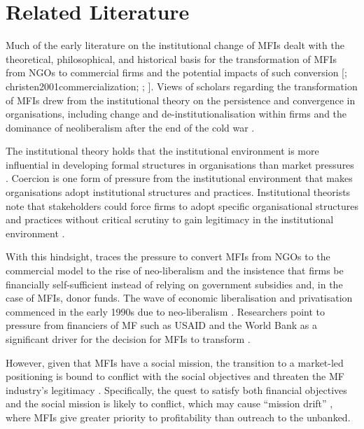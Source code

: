 \documentclass[a4paper, nobind]{templates/ociamthesis}
\begin{document}
\hypertarget{related-literature}{%
\section{Related Literature}\label{related-literature}}

Much of the early literature on the institutional change of MFIs dealt with the theoretical, philosophical, and historical basis for the transformation of MFIs from NGOs to commercial firms and the potential impacts of such conversion {[}\textcite{campion1999institutional}; christen2001commercialization; \textcite{gutierrez201920}; \textcite{zaby2019science}{]}. Views of scholars regarding the transformation of MFIs drew from the institutional theory on the persistence and convergence in organisations, including change and de-institutionalisation within firms \autocite{scott2004institutional} and the dominance of neoliberalism after the end of the cold war \autocite{ostry2017}.

The institutional theory holds that the institutional environment is more influential in developing formal structures in organisations than market pressures \autocite{maggio1991}. Coercion is one form of pressure from the institutional environment that makes organisations adopt institutional structures and practices. Institutional theorists note that stakeholders could force firms to adopt specific organisational structures and practices without critical scrutiny to gain legitimacy in the institutional environment \autocite{scott2004institutional,martinez2017coercive}.

With this hindsight, \textcite{bateman2010doesn} traces the pressure to convert MFIs from NGOs to the commercial model to the rise of neo-liberalism and the insistence that firms be financially self-sufficient instead of relying on government subsidies and, in the case of MFIs, donor funds. The wave of economic liberalisation and privatisation commenced in the early 1990s due to neo-liberalism \autocite{silva1998neoliberalism}. Researchers point to pressure from financiers of MF such as USAID and the World Bank as a significant driver for the decision for MFIs to transform \autocite{ostry2017}.

However, given that MFIs have a social mission, the transition to a market-led positioning is bound to conflict with the social objectives and threaten the MF industry's legitimacy \autocite{ramus2017,nason2018behavioral}. Specifically, the quest to satisfy both financial objectives and the social mission is likely to conflict, which may cause ``mission drift'' \autocite{mersland2010microfinance,mia2017mission}, where MFIs give greater priority to profitability than outreach to the unbanked.
\end{document}

